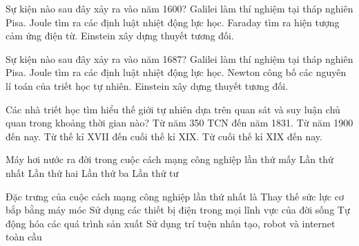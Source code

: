 \begin{ex}
Sự kiện nào sau đây xảy ra vào năm 1600?
\choice
{\True Galilei làm thí nghiệm tại tháp nghiên Pisa.}
{Joule tìm ra các định luật nhiệt động lực học.}
{Faraday tìm ra hiện tượng cảm ứng điện từ.}
{Einstein xây dựng thuyết tương đối.}
\end{ex}

\begin{ex}
Sự kiện nào sau đây xảy ra vào năm 1687?
\choice
{Galilei làm thí nghiệm tại tháp nghiên Pisa.}
{Joule tìm ra các định luật nhiệt động lực học.}
{\True Newton công bố các nguyên lí toán của triết học tự nhiên.}
{Einstein xây dựng thuyết tương đối.}
\end{ex}

\begin{ex}
Các nhà triết học tìm hiểu thế giới tự nhiên dựa trên quan sát và suy luận chủ quan trong khoảng thời gian nào?
\choice
{\True Từ năm 350 TCN đến năm 1831.}
{Từ năm 1900 đến nay.}
{Từ thế kỉ XVII đến cuối thế kỉ XIX.}
{Từ cuối thế kỉ XIX đến nay.}
\end{ex}

\begin{ex}
Máy hơi nước ra đời trong cuộc cách mạng công nghiệp lần thứ mấy
\choice
{\True Lần thứ nhất}
{Lần thứ hai}
{Lần thứ ba}
{Lần thứ tư}
\end{ex}

\begin{ex}
Đặc trưng của cuộc cách mạng công nghiệp lần thứ nhất là 
\choice
{\True Thay thế sức lực cơ bắp bằng máy móc}
{Sử dụng các thiết bị điện trong mọi lĩnh vực của đời sống}
{Tự động hóa các quá trình sản xuất}
{Sử dụng trí tuện nhân tạo, robot và internet toàn cầu}
\end{ex}

